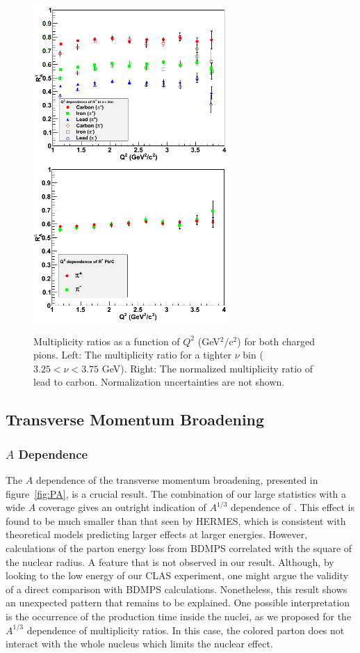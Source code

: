 \begin{figure}[tbp]
\centering
\includegraphics[width=7.4cm] {chap6-fig/F_RvQ2inNu.png} 
\includegraphics[width=7.4cm] {chap6-fig/F_RvQ2_PbC.png} 
\caption {Multiplicity ratios as a function of $Q^2$ (GeV$^2$/c$^2$) for both charged pions. Left: The multiplicity ratio for a tighter $\nu$ bin ($3.25 < \nu < 3.75$ GeV). Right: The normalized multiplicity ratio of lead to carbon. Normalization uncertainties are not shown.}
\label{fig:RQ2Detailed}
\end{figure}

\subsection{Transverse Momentum Broadening}

\subsubsection{$A$ Dependence}

The $A$ dependence of the transverse momentum broadening, presented in 
figure~\ref{fig:PA}, is a crucial result. The combination of our large 
statistics with a wide $A$ coverage gives an outright indication of $A^{1/3}$ 
dependence of \dpt. This \dpt effect is found to be much smaller than that seen 
by HERMES\cite{Airapetian:2009jy}, which is consistent with
 theoretical models predicting larger effects at larger energies. However, 
calculations of the parton energy loss from BDMPS \cite{Baier:1996sk} 
correlated \pt with the square of the nuclear radius. A feature that is not 
observed in our result. Although, by looking to the low energy of our CLAS 
experiment, one might argue the validity of a direct comparison with BDMPS 
calculations. Nonetheless, this result shows an unexpected pattern that 
remains to be explained. One possible interpretation is the occurrence of 
the production time inside the nuclei, as we proposed for the $A^{1/3}$ 
dependence of multiplicity ratios. In this case, the colored parton does 
not interact with the whole nucleus which limits the nuclear effect.

